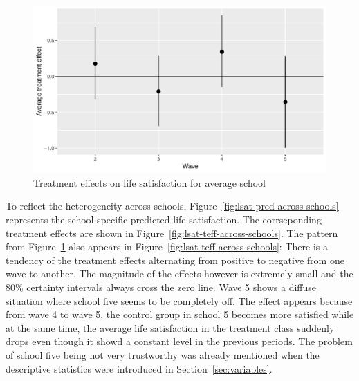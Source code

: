 \documentclass[a4, 12pt]{article}
\begin{document}
\begin{figure}[H]

{\centering \includegraphics[width=0.8\linewidth,]{../figures/lsat_teff} 

}

\caption{Treatment effects on life satisfaction for average school}\label{fig:lsat-teff}
\end{figure}

To reflect the heterogeneity across schools, Figure~\ref{fig:lsat-pred-across-schools} represents the school-specific predicted life satisfaction. The corrseponding treatment effects are shown in Figure~\ref{fig:lsat-teff-across-schools}. The pattern from Figure~\ref{fig:lsat-teff} also appears in Figure~\ref{fig:lsat-teff-across-schools}: There is a tendency of the treatment effects alternating from positive to negative from one wave to another. The magnitude of the effects however is extremely small and the 80\% certainty intervals always cross the zero line. Wave 5 shows a diffuse situation where school five seems to be completely off. The effect appears because from wave 4 to wave 5, the control group in school 5 becomes more satisfied while at the same time, the average life satisfaction in the treatment class suddenly drops even though it showd a constant level in the previous periods. The problem of school five being not very trustworthy was already mentioned when the descriptive statistics were introduced in Section~\ref{sec:variables}.
\end{document}
